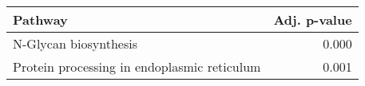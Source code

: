 \begin{tabular}{lr}
\toprule
                                     Pathway &  Adj. p-value \\
\midrule
                       N-Glycan biosynthesis &         0.000 \\
 Protein processing in endoplasmic reticulum &         0.001 \\
\bottomrule
\end{tabular}
